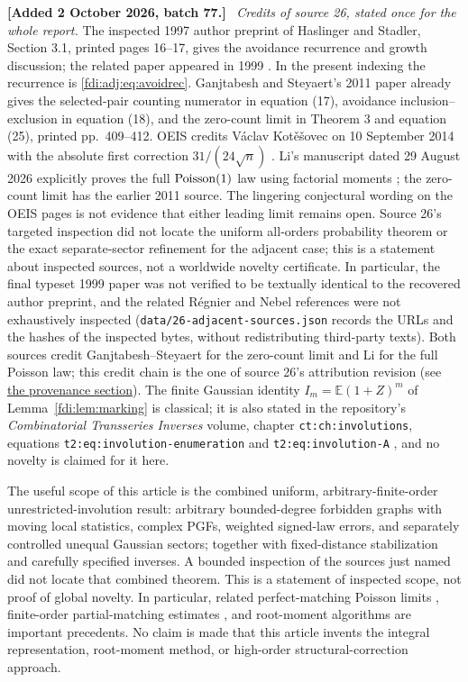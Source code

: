 \documentclass[11pt,letterpaper]{article}
\theoremstyle{remark}\newtheorem{remark}[theorem]{Remark}
\newcommand{\E}{\mathbb E}\newcommand{\Prb}{\mathbb P}\newcommand{\R}{\mathbb R}\newcommand{\C}{\mathbb C}
\newenvironment{mergenote}[1][2 October 2026, batch 77]{\par\smallskip\begingroup\small\noindent\textbf{[Added #1.]}\ }{\endgroup\par\smallskip}
\begin{document}
\begin{mergenote}
\emph{Credits of source 26, stated once for the whole report.} The inspected 1997 author preprint of Haslinger and Stadler, Section 3.1, printed pages 16--17, gives the avoidance recurrence and growth discussion; the related paper appeared in 1999 \cite{hs1997,hs1999}. In the present indexing the recurrence is \eqref{fdi:adj:eq:avoidrec}. Ganjtabesh and Steyaert's 2011 paper \cite[Section 5]{ganjtabesh} already gives the selected-pair counting numerator in equation (17), avoidance inclusion--exclusion in equation (18), and the zero-count limit in Theorem 3 and equation (25), printed pp.~409--412. OEIS credits V\'aclav Kot\v{e}\v{s}ovec on 10 September 2014 with the absolute first correction $31/(24\sqrt n)$ \cite{oeis170941}. Li's manuscript dated 29 August 2026 explicitly proves the full $\operatorname{Poisson}(1)$ law using factorial moments \cite[theorem labelled \texttt{thm:poisson}]{li}; the zero-count limit has the earlier 2011 source. The lingering conjectural wording on the OEIS pages is not evidence that either leading limit remains open. Source 26's targeted inspection did not locate the uniform all-orders probability theorem or the exact separate-sector refinement for the adjacent case; this is a statement about inspected sources, not a worldwide novelty certificate. In particular, the final typeset 1999 paper was not verified to be textually identical to the recovered author preprint, and the related R\'egnier and Nebel references were not exhaustively inspected (\texttt{data/26-adjacent-sources.json} records the URLs and the hashes of the inspected bytes, without redistributing third-party texts). Both sources credit Ganjtabesh--Steyaert for the zero-count limit and Li for the full Poisson law; this credit chain is the one of source 26's attribution revision (see \hyperref[fdi:sec:provenance]{the provenance section}). The finite Gaussian identity $I_m=\E(1+Z)^m$ of Lemma~\ref{fdi:lem:marking} is classical; it is also stated in the repository's \emph{Combinatorial Transseries Inverses} volume, chapter \texttt{ct:ch:involutions}, equations \texttt{t2:eq:involution-enumeration} and \texttt{t2:eq:involution-A} \cite{cti}, and no novelty is claimed for it here.
\end{mergenote}

The useful scope of this article is the combined uniform, arbitrary-finite-order unrestricted-involution result: arbitrary bounded-degree forbidden graphs with moving local statistics, complex PGFs, weighted signed-law errors, and separately controlled unequal Gaussian sectors; together with fixed-distance stabilization and carefully specified inverses. A bounded inspection of the sources just named did not locate that combined theorem. This is a statement of inspected scope, not proof of global novelty. In particular, related perfect-matching Poisson limits \cite{deng}, finite-order partial-matching estimates \cite{greenhill}, and root-moment algorithms \cite{wanless} are important precedents. No claim is made that this article invents the integral representation, root-moment method, or high-order structural-correction approach.
\end{document}
